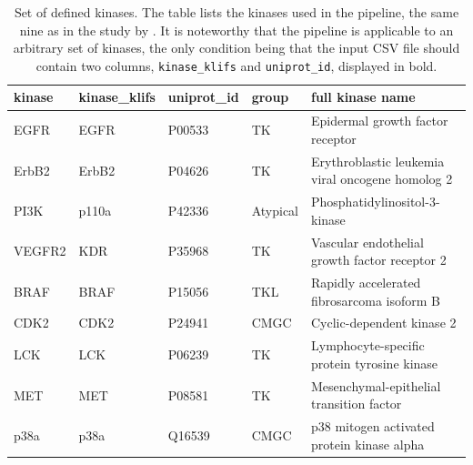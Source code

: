 \documentclass[9pt,training]{livecoms}
\begin{document}
\begin{table}
\centering
\begin{tabular}{lllll}
\hline
kinase & \textbf{kinase\_klifs} & \textbf{uniprot\_id} & group    & full kinase name                               \\
\hline
\hline
EGFR   & EGFR          & P00533      & TK       & Epidermal growth factor receptor                 \\
ErbB2  & ErbB2         & P04626      & TK       & Erythroblastic leukemia viral oncogene homolog 2 \\
PI3K   & p110a         & P42336      & Atypical & Phosphatidylinositol-3-kinase                    \\
VEGFR2 & KDR           & P35968      & TK       & Vascular endothelial growth factor receptor 2    \\
BRAF   & BRAF          & P15056      & TKL      & Rapidly accelerated fibrosarcoma isoform B       \\
CDK2   & CDK2          & P24941      & CMGC     & Cyclic-dependent kinase 2                        \\
LCK    & LCK           & P06239      & TK       & Lymphocyte-specific protein tyrosine kinase      \\
MET    & MET           & P08581      & TK       & Mesenchymal-epithelial transition factor         \\
p38a   & p38a          & Q16539      & CMGC     & p38 mitogen activated protein kinase alpha      \\
\hline
\end{tabular}
    \caption{Set of defined kinases. The table lists the kinases used in the pipeline, the same nine as in the study by \citet{Schmidt_2021_molecules}. It is noteworthy that the pipeline is applicable to an arbitrary set of kinases, the only condition being that the input CSV file should contain two columns, \texttt{kinase\_klifs} and \texttt{uniprot\_id}, displayed in bold.}
    \label{tab:kinase_selection}
\end{table}

\end{document}

